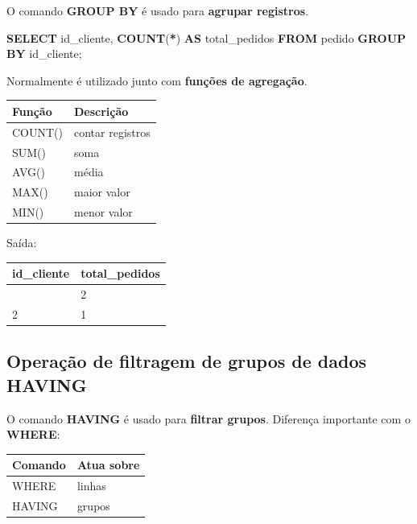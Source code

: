 \documentclass[
]{book}
\newenvironment{Shaded}{\begin{snugshade}}{\end{snugshade}}
\newcommand{\FunctionTok}[1]{\textcolor[rgb]{0.13,0.29,0.53}{\textbf{#1}}}
\newcommand{\KeywordTok}[1]{\textcolor[rgb]{0.13,0.29,0.53}{\textbf{#1}}}
\newcommand{\NormalTok}[1]{#1}
\newcommand{\OperatorTok}[1]{\textcolor[rgb]{0.81,0.36,0.00}{\textbf{#1}}}
\begin{document}
O comando \textbf{GROUP BY} é usado para \textbf{agrupar registros}.

\begin{Shaded}
\begin{Highlighting}[]
\KeywordTok{SELECT}\NormalTok{ id\_cliente, }\FunctionTok{COUNT}\NormalTok{(}\OperatorTok{*}\NormalTok{) }\KeywordTok{AS}\NormalTok{ total\_pedidos}
\KeywordTok{FROM}\NormalTok{ pedido}
\KeywordTok{GROUP} \KeywordTok{BY}\NormalTok{ id\_cliente;}
\end{Highlighting}
\end{Shaded}

Normalmente é utilizado junto com \textbf{funções de agregação}.

\begin{longtable}[]{@{}ll@{}}
\toprule\noalign{}
Função & Descrição \\
\midrule\noalign{}
\endhead
\bottomrule\noalign{}
\endlastfoot
COUNT() & contar registros \\
SUM() & soma \\
AVG() & média \\
MAX() & maior valor \\
MIN() & menor valor \\
\end{longtable}

Saída:

\begin{longtable}[]{@{}ll@{}}
\toprule\noalign{}
id\_cliente & total\_pedidos \\
\midrule\noalign{}
\endhead
\bottomrule\noalign{}
\endlastfoot
1 & 2 \\
2 & 1 \\
\end{longtable}

\subsection{Operação de filtragem de grupos de dados HAVING}\label{operauxe7uxe3o-de-filtragem-de-grupos-de-dados-having}

O comando \textbf{HAVING} é usado para \textbf{filtrar grupos}. Diferença importante com o \textbf{WHERE}:

\begin{longtable}[]{@{}ll@{}}
\toprule\noalign{}
Comando & Atua sobre \\
\midrule\noalign{}
\endhead
\bottomrule\noalign{}
\endlastfoot
WHERE & linhas \\
HAVING & grupos \\
\end{longtable}
\end{document}

